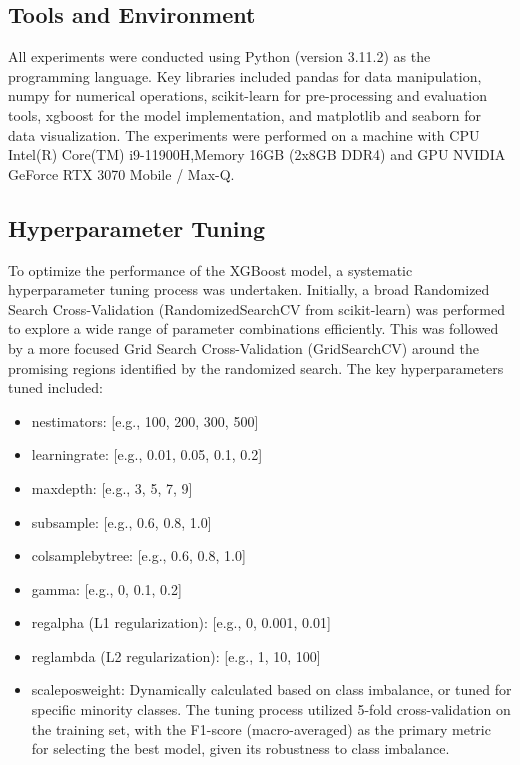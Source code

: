 \subsection{Tools and Environment}
All experiments were conducted using Python (version 3.11.2) as the programming language. Key libraries included pandas for data manipulation, numpy for numerical operations, scikit-learn for pre-processing and evaluation tools, xgboost for the model implementation, and matplotlib and seaborn for data visualization. The experiments were performed on a machine with CPU Intel(R) Core(TM) i9-11900H,Memory 16GB (2x8GB DDR4) and GPU NVIDIA GeForce RTX 3070 Mobile / Max-Q.

\subsection{Hyperparameter Tuning}
To optimize the performance of the XGBoost model, a systematic hyperparameter tuning process was undertaken. Initially, a broad Randomized Search Cross-Validation (RandomizedSearchCV from scikit-learn) was performed to explore a wide range of parameter combinations efficiently. This was followed by a more focused Grid Search Cross-Validation (GridSearchCV) around the promising regions identified by the randomized search. The key hyperparameters tuned included:
\begin{itemize}
	\item n\textunderscore estimators: [e.g., 100, 200, 300, 500]
	\item learning\textunderscore rate: [e.g., 0.01, 0.05, 0.1, 0.2]
	\item max\textunderscore depth: [e.g., 3, 5, 7, 9]
	\item subsample: [e.g., 0.6, 0.8, 1.0]
	\item colsample\textunderscore bytree: [e.g., 0.6, 0.8, 1.0]
	\item gamma: [e.g., 0, 0.1, 0.2]
	\item reg\textunderscore alpha (L1 regularization): [e.g., 0, 0.001, 0.01]
	\item  reg\textunderscore lambda (L2 regularization): [e.g., 1, 10, 100]
	\item scale\textunderscore pos\textunderscore weight: Dynamically calculated based on class imbalance, or tuned for specific minority classes. The tuning process utilized 5-fold cross-validation on the training set, with the F1-score (macro-averaged) as the primary metric for selecting the best model, given its robustness to class imbalance.
\end{itemize}

